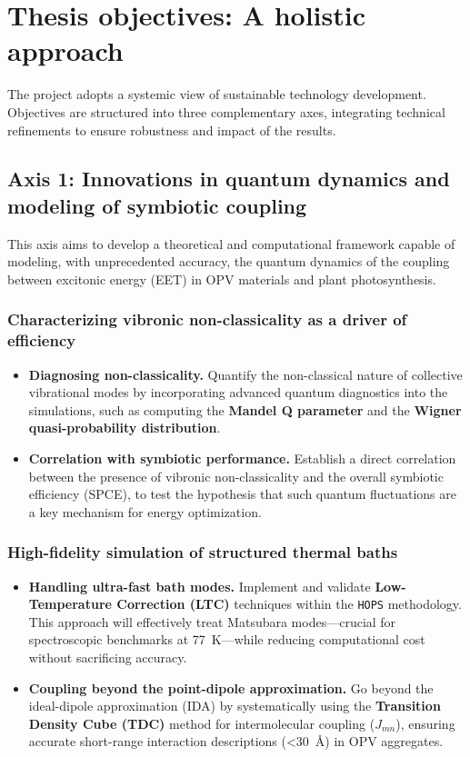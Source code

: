 \documentclass[12pt, a4paper]{article}
\begin{document}
\section{Thesis objectives: A holistic approach}

The project adopts a systemic view of sustainable technology development. Objectives are structured into three complementary axes, integrating technical refinements to ensure robustness and impact of the results.

\subsection{Axis 1: Innovations in quantum dynamics and modeling of symbiotic coupling}

This axis aims to develop a theoretical and computational framework capable of modeling, with unprecedented accuracy, the quantum dynamics of the coupling between excitonic energy (EET) in OPV materials and plant photosynthesis.

\subsubsection{Characterizing vibronic non-classicality as a driver of efficiency}
\begin{itemize}
    \item \textbf{Diagnosing non-classicality.} Quantify the non-classical nature of collective vibrational modes by incorporating advanced quantum diagnostics into the simulations, such as computing the \textbf{Mandel Q parameter} and the \textbf{Wigner quasi-probability distribution}.

    \item \textbf{Correlation with symbiotic performance.} Establish a direct correlation between the presence of vibronic non-classicality and the overall symbiotic efficiency (SPCE), to test the hypothesis that such quantum fluctuations are a key mechanism for energy optimization.
\end{itemize}

\subsubsection{High-fidelity simulation of structured thermal baths}
\begin{itemize}
    \item \textbf{Handling ultra-fast bath modes.} Implement and validate \textbf{Low-Temperature Correction (LTC)} techniques within the \texttt{HOPS} methodology. This approach will effectively treat Matsubara modes—crucial for spectroscopic benchmarks at \SI{77}{\kelvin}—while reducing computational cost without sacrificing accuracy.

    \item \textbf{Coupling beyond the point-dipole approximation.} Go beyond the ideal-dipole approximation (IDA) by systematically using the \textbf{Transition Density Cube (TDC)} method for intermolecular coupling ($J_{mn}$), ensuring accurate short-range interaction descriptions (\SI{<30}{\angstrom}) in OPV aggregates.
\end{itemize}
\end{document}
